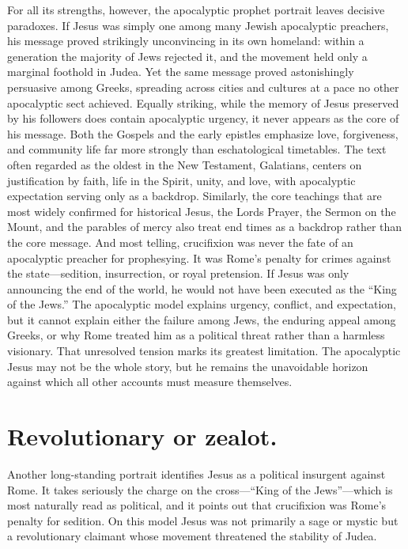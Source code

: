 For all its strengths, however, the apocalyptic prophet portrait leaves decisive paradoxes.
If Jesus was simply one among many Jewish apocalyptic preachers, his message proved strikingly unconvincing in its own homeland: within a generation the majority of Jews rejected it, and the movement held only a marginal foothold in Judea.
Yet the same message proved astonishingly persuasive among Greeks, spreading across cities and cultures at a pace no other apocalyptic sect achieved.
Equally striking, while the memory of Jesus preserved by his followers does contain apocalyptic urgency, it never appears as the core of his message.
Both the Gospels and the early epistles emphasize love, forgiveness, and community life far more strongly than eschatological timetables.
The text often regarded as the oldest in the New Testament, Galatians, centers on justification by faith, life in the Spirit, unity, and love, with apocalyptic expectation serving only as a backdrop.
Similarly, the core teachings that are most widely confirmed for historical Jesus, the Lords Prayer, the Sermon on the Mount, and the parables of mercy also treat end times as a backdrop rather than the core message.
And most telling, crucifixion was never the fate of an apocalyptic preacher for prophesying.
It was Rome’s penalty for crimes against the state—sedition, insurrection, or royal pretension.
If Jesus was only announcing the end of the world, he would not have been executed as the “King of the Jews.”
The apocalyptic model explains urgency, conflict, and expectation, but it cannot explain either the failure among Jews, the enduring appeal among Greeks, or why Rome treated him as a political threat rather than a harmless visionary.
That unresolved tension marks its greatest limitation.
The apocalyptic Jesus may not be the whole story, but he remains the unavoidable horizon against which all other accounts must measure themselves.

\section{Revolutionary or zealot.}\label{sec:revolutionary}

Another long-standing portrait identifies Jesus as a political insurgent against Rome.
It takes seriously the charge on the cross—“King of the Jews”—which is most naturally read as political, and it points out that crucifixion was Rome’s penalty for sedition.
On this model Jesus was not primarily a sage or mystic but a revolutionary claimant whose movement threatened the stability of Judea.

